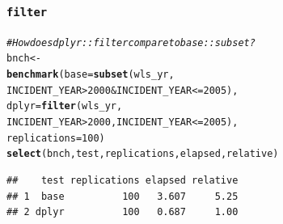\documentclass{beamer}\usepackage[]{graphicx}\usepackage[]{color}
\makeatletter
\newcommand{\hlnum}[1]{\textcolor[rgb]{0.686,0.059,0.569}{#1}}%
\newcommand{\hlcom}[1]{\textcolor[rgb]{0.678,0.584,0.686}{\textit{#1}}}%
\newcommand{\hlopt}[1]{\textcolor[rgb]{0,0,0}{#1}}%
\newcommand{\hlstd}[1]{\textcolor[rgb]{0.345,0.345,0.345}{#1}}%
\newcommand{\hlkwb}[1]{\textcolor[rgb]{0.69,0.353,0.396}{#1}}%
\newcommand{\hlkwc}[1]{\textcolor[rgb]{0.333,0.667,0.333}{#1}}%
\newcommand{\hlkwd}[1]{\textcolor[rgb]{0.737,0.353,0.396}{\textbf{#1}}}%
\newenvironment{kframe}{%
 \def\at@end@of@kframe{}%
 \ifinner\ifhmode%
  \def\at@end@of@kframe{\end{minipage}}%
  \begin{minipage}{\columnwidth}%
 \fi\fi%
 \def\FrameCommand##1{\hskip\@totalleftmargin \hskip-\fboxsep
 \colorbox{shadecolor}{##1}\hskip-\fboxsep
     \hskip-\linewidth \hskip-\@totalleftmargin \hskip\columnwidth}%
 \MakeFramed {\advance\hsize-\width
   \@totalleftmargin\z@ \linewidth\hsize
   \@setminipage}}%
 {\par\unskip\endMakeFramed%
 \at@end@of@kframe}
\newenvironment{knitrout}{}{} %
\makeatother
\begin{document}
\begin{frame}[fragile]
  \frametitle{{\tt filter}}

\begin{knitrout}\footnotesize
{}\color{fgcolor}\begin{kframe}
\begin{alltt}
\hlcom{# How does dplyr::filter compare to base::subset?}
\hlstd{bnch} \hlkwb{<-}
  \hlkwd{benchmark}\hlstd{(}\hlkwc{base} \hlstd{=} \hlkwd{subset}\hlstd{(wls_yr,}
                          \hlstd{INCIDENT_YEAR} \hlopt{>} \hlnum{2000} \hlopt{&} \hlstd{INCIDENT_YEAR} \hlopt{<=} \hlnum{2005}\hlstd{),}
            \hlkwc{dplyr} \hlstd{=} \hlkwd{filter}\hlstd{(wls_yr,}
                           \hlstd{INCIDENT_YEAR} \hlopt{>} \hlnum{2000}\hlstd{, INCIDENT_YEAR} \hlopt{<=} \hlnum{2005}\hlstd{),}
            \hlkwc{replications} \hlstd{=} \hlnum{100}\hlstd{)}
\hlkwd{select}\hlstd{(bnch, test, replications, elapsed, relative)}
\end{alltt}
\begin{verbatim}
##    test replications elapsed relative
## 1  base          100   3.607     5.25
## 2 dplyr          100   0.687     1.00
\end{verbatim}
\end{kframe}
\end{knitrout}
\end{frame} 
\end{document}
